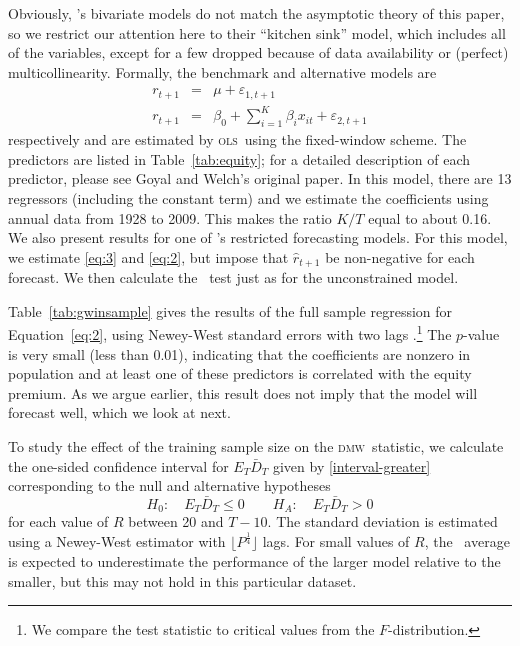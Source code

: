 \documentclass[11pt]{article}
\newcommand{\citepos}[1]{\citeauthor{#1}'s \citeyearpar{#1}}
\newcommand{\oosB}{\bar{D}_{T}}
\newcommand{\dmw}{\textsc{dmw}}
\newcommand{\ols}{\textsc{ols}}
\begin{document}
Obviously, \citepos{GoW:08} bivariate models do not
match the asymptotic theory of this paper, so we restrict our
attention here to their ``kitchen sink'' model, which includes all of
the variables, except for a few dropped because of data availability or
(perfect) multicollinearity.  Formally, the benchmark and alternative models are
\begin{eqnarray}
  \label{eq:3}
  r_{t+1} &=& \mu + \varepsilon_{1,t+1} \\
  \label{eq:2}
r_{t+1} &=& \beta_0 + \sum_{i=1}^K \beta_{i} x_{it} + \varepsilon_{2,t+1}  
\end{eqnarray}
respectively and are estimated by \ols\ using the fixed-window scheme.
The predictors are listed in Table~\ref{tab:equity}; for a detailed
description of each predictor, please see Goyal and Welch's original
paper.  In this model, there are 13 regressors (including the constant
term) and we estimate the coefficients using annual data from 1928 to
2009.  This makes the ratio $K/T$ equal to about 0.16.  We also
present results for one of \citepos{CaT:08}
restricted forecasting models.  For this model, we estimate
\eqref{eq:3} and \eqref{eq:2}, but impose that $\hat r_{t+1}$ be
non-negative for each forecast.  We then calculate the \oos\ test just
as for the unconstrained model.

Table~\ref{tab:gwinsample} gives the results of the full sample
regression for Equation~\eqref{eq:2}, using Newey-West standard errors
with two lags \citep{NeW:87}.\footnote{We compare the test statistic
  to critical values from the $F$-distribution.}  The $p$-value is
very small (less than 0.01), indicating that the coefficients are
nonzero in population and at least one of these predictors is
correlated with the equity premium.  As we argue earlier, this result
does not imply that the model will forecast well, which we look at
next.

To study the effect of the training sample size on the \dmw\ statistic, we
calculate the one-sided confidence interval for $E_T \oosB$ given
by \eqref{interval-greater} corresponding to the null and alternative
hypotheses
\[ H_0: \quad E_T \oosB \leq 0 \qquad
H_A: \quad E_T \oosB > 0
\]
for each value of $R$ between 20 and $T-10$.  The standard deviation
is estimated using a Newey-West estimator with $\lfloor
P^{\frac14}\rfloor$ lags.  For small values of $R$, the \oos\ average
is expected to underestimate the performance of the larger model
relative to the smaller, but this may not hold in this particular
dataset.
\end{document}
